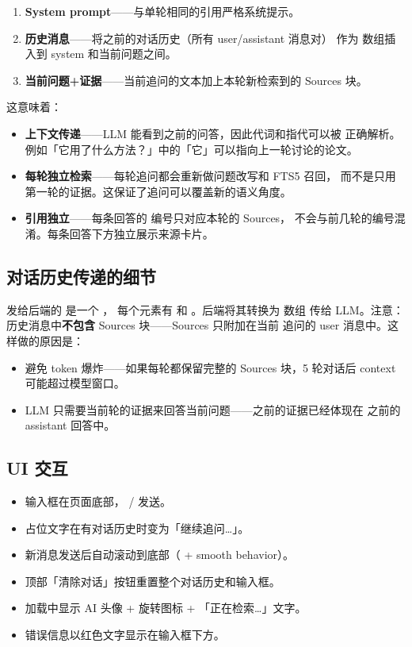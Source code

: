 \begin{enumerate}
  \item \textbf{System prompt}——与单轮相同的引用严格系统提示。
  \item \textbf{历史消息}——将之前的对话历史（所有 user/assistant 消息对）
    作为  数组插入到 system 和当前问题之间。
  \item \textbf{当前问题+证据}——当前追问的文本加上本轮新检索到的 Sources 块。
\end{enumerate}

这意味着：

\begin{itemize}
  \item \textbf{上下文传递}——LLM 能看到之前的问答，因此代词和指代可以被
    正确解析。例如「它用了什么方法？」中的「它」可以指向上一轮讨论的论文。
  \item \textbf{每轮独立检索}——每轮追问都会重新做问题改写和 FTS5 召回，
    而不是只用第一轮的证据。这保证了追问可以覆盖新的语义角度。
  \item \textbf{引用独立}——每条回答的 \cmd{[N]} 编号只对应本轮的 Sources，
    不会与前几轮的编号混淆。每条回答下方独立展示来源卡片。
\end{itemize}

\subsection{对话历史传递的细节}

发给后端的  是一个 ，
每个元素有  和 。后端将其转换为  数组
传给 LLM。注意：历史消息中\textbf{不包含} Sources 块——Sources 只附加在当前
追问的 user 消息中。这样做的原因是：

\begin{itemize}
  \item 避免 token 爆炸——如果每轮都保留完整的 Sources 块，5 轮对话后
    context 可能超过模型窗口。
  \item LLM 只需要当前轮的证据来回答当前问题——之前的证据已经体现在
    之前的 assistant 回答中。
\end{itemize}

\subsection{UI 交互}

\begin{itemize}
  \item 输入框在页面底部， /  发送。
  \item 占位文字在有对话历史时变为「继续追问…」。
  \item 新消息发送后自动滚动到底部（ + smooth behavior）。
  \item 顶部「清除对话」按钮重置整个对话历史和输入框。
  \item 加载中显示 AI 头像 + 旋转图标 + 「正在检索…」文字。
  \item 错误信息以红色文字显示在输入框下方。
\end{itemize}

